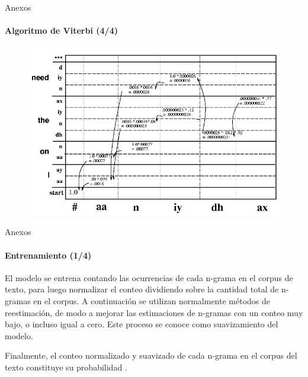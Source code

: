 \begin{frame}[noframenumbering]{Anexos}
\framesubtitle{Algoritmo de Viterbi (4/4)}
\begin{figure}[H]
\centering
\includegraphics[width=1\linewidth]{./graphics/viterbi3.png}
\end{figure}
\end{frame}

\begin{frame}[noframenumbering]{Anexos}
\framesubtitle{Entrenamiento (1/4)}

El modelo se entrena contando las ocurrencias de cada n-grama en el corpus de texto, para luego
normalizar el conteo dividiendo sobre la cantidad total de n-gramas en el corpus.
A continuaci\'on se utilizan normalmente m\'etodos de reestimaci\'on, de modo a mejorar las estimaciones 
de n-gramas con un conteo muy bajo, o incluso igual a cero. Este proceso se conoce como suavizamiento
del modelo.

Finalmente, el conteo normalizado y suavizado de cada n-grama en el corpus del texto constituye su
probabilidad \cite{CollinsLanguage}.

\end{frame}

